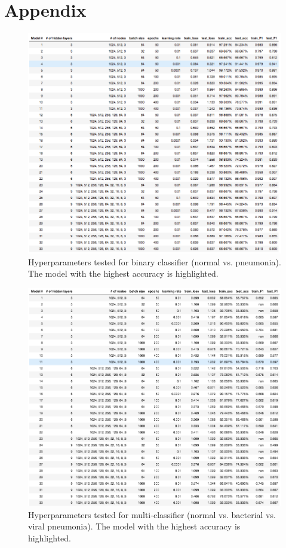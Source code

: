 \documentclass[conference]{IEEEtran}
\begin{document}
\section{Appendix}
\begin{figure}[htbp]
\centerline{\includegraphics[scale=0.28]{bin_results.png}}
\caption{Hyperparameters tested for binary classifier (normal vs. pneumonia). The model with the highest accuracy is highlighted.}
\label{fig}
\end{figure}

\begin{figure}[htbp]
\centerline{\includegraphics[scale=0.28]{multi_results.png}}
\caption{Hyperparameters tested for multi-classifier (normal vs. bacterial vs. viral pneumonia). The model with the highest accuracy is highlighted.}
\label{fig}
\end{figure}
\end{document}
